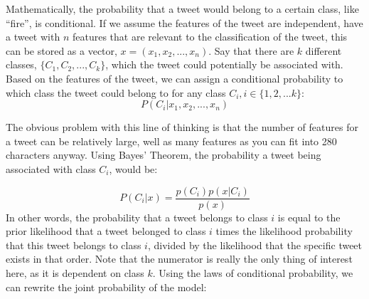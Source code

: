 \documentclass[titlepage, 12pt]{article}
\begin{document}
Mathematically, the probability that a tweet would belong to a certain class, like ``fire'', is conditional. If we assume the features of the tweet are independent, have a tweet with $n$ features that are relevant to the classification of the tweet, this can be stored as a vector, $x = (x_1, x_2, ..., x_n)$. Say that there are $k$ different classes, $\{C_1, C_2, ..., C_k\}$, which the tweet could potentially be associated with. Based on the features of the tweet, we can assign a conditional probability to which class the tweet could belong to for any class $C_i, i \in \{1, 2, ... k\}$:
\begin{equation}
    P(C_i | x_1, x_2, ..., x_n)
\end{equation}

The obvious problem with this line of thinking is that the number of features for a tweet can be relatively large, well as many features as you can fit into 280 characters anyway. Using Bayes' Theorem, the probability a tweet being associated with class $C_i$, would be:

\begin{equation}
    P(C_i | x) = \frac{p(C_i)p(x|C_i)}{p(x)}
\end{equation}
In other words, the probability that a tweet belongs to class $i$ is equal to the prior likelihood that a tweet belonged to class $i$ times the likelihood probability that this tweet belongs to class $i$, divided by the likelihood that the specific tweet exists in that order. Note that the numerator is really the only thing of interest here, as it is dependent on class $k$. Using the laws of conditional probability, we can rewrite the joint probability of the model:
\end{document}
